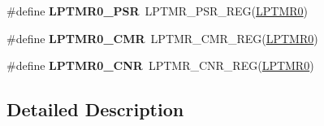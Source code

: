 \begin{DoxyCompactItemize}
\item 
\#define {\bfseries L\+P\+T\+M\+R0\+\_\+\+P\+SR}~L\+P\+T\+M\+R\+\_\+\+P\+S\+R\+\_\+\+R\+EG(\hyperlink{group__LPTMR__Peripheral__Access__Layer_gaba0c3bc8a32ad5a884c99e019dbdef85}{L\+P\+T\+M\+R0})\hypertarget{group__LPTMR__Register__Accessor__Macros_ga69b40af8e215d5b29b3f9677d7f8d632}{}\label{group__LPTMR__Register__Accessor__Macros_ga69b40af8e215d5b29b3f9677d7f8d632}

\item 
\#define {\bfseries L\+P\+T\+M\+R0\+\_\+\+C\+MR}~L\+P\+T\+M\+R\+\_\+\+C\+M\+R\+\_\+\+R\+EG(\hyperlink{group__LPTMR__Peripheral__Access__Layer_gaba0c3bc8a32ad5a884c99e019dbdef85}{L\+P\+T\+M\+R0})\hypertarget{group__LPTMR__Register__Accessor__Macros_gac109508795b1b22820940313ddb4c620}{}\label{group__LPTMR__Register__Accessor__Macros_gac109508795b1b22820940313ddb4c620}

\item 
\#define {\bfseries L\+P\+T\+M\+R0\+\_\+\+C\+NR}~L\+P\+T\+M\+R\+\_\+\+C\+N\+R\+\_\+\+R\+EG(\hyperlink{group__LPTMR__Peripheral__Access__Layer_gaba0c3bc8a32ad5a884c99e019dbdef85}{L\+P\+T\+M\+R0})\hypertarget{group__LPTMR__Register__Accessor__Macros_gada9bf6b3d564321571ac27faa4d263ad}{}\label{group__LPTMR__Register__Accessor__Macros_gada9bf6b3d564321571ac27faa4d263ad}

\end{DoxyCompactItemize}


\subsection{Detailed Description}
